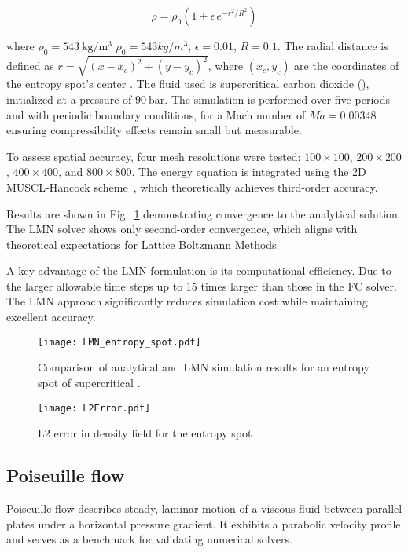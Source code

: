 \begin{equation}
    \rho = \rho_0 \left(1 + \epsilon\, e^{-r^2/R^2} \right)
\end{equation}

where $\rho_0 = 543\ \mathrm{kg/m^3}$ $\rho_0 = 543\si{kg/m^3}$, $\epsilon =
0.01$, $R = 0.1$. The radial distance is defined as $r = \sqrt{(x - x_c)^2 + (y
- y_c)^2}$, where $(x_c, y_c)$ are the coordinates of the entropy spot's center
. The fluid used is supercritical carbon dioxide (), initialized at a
pressure of $90\ \mathrm{bar}$. The simulation is performed over five periods
and with periodic boundary conditions, for a Mach number of $M\!a = 0.00348$
ensuring compressibility effects remain small but measurable.

To assess spatial accuracy, four mesh resolutions were tested: $100\times100$,
$200\times200$, $400\times400$, and $800\times800$. The energy equation is
integrated using the 2D MUSCL-Hancock scheme~\cite{wissocq2022restoring}, which
theoretically achieves third-order accuracy.

Results are shown in Fig.~\ref{fig: Entropy LMN} demonstrating convergence to
the analytical solution. The LMN solver shows only second-order convergence,
which aligns with theoretical expectations for Lattice Boltzmann Methods.

A key advantage of the LMN formulation is its computational efficiency. Due to
the larger allowable time steps up to 15 times larger than those in the FC
solver. The LMN approach significantly reduces simulation cost while maintaining
excellent accuracy.

\begin{figure}[htpb]
    \centering
    \texttt{[image: LMN\_entropy\_spot.pdf]}
    \caption{Comparison of analytical and LMN simulation results for an entropy spot of supercritical .}
    \label{fig: Entropy LMN}
\end{figure}
    
    
\begin{figure}[htb]
    \centering
    \texttt{[image: L2Error.pdf]}
    \caption{L2 error in density field for the entropy spot}
    \label{L2 error}
\end{figure}

\subsection{Poiseuille flow}
Poiseuille flow describes steady, laminar motion of a viscous fluid between
parallel plates under a horizontal pressure gradient. It exhibits a parabolic
velocity profile and serves as a benchmark for validating numerical solvers.

